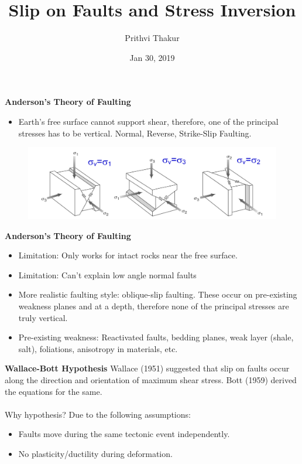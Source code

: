 \documentclass[11pt]{beamer}
\title{\textbf{Slip on Faults and Stress Inversion}}
\date{Jan 30, 2019}
\author{Prithvi Thakur}
\newcommand{\hl}[1]{\textcolor{myhl}{#1}}
\begin{document}
\maketitle

\linespread{1.3}

\begin{frame}{\textbf{Anderson's Theory of Faulting}}
    \begin{itemize}
        \item Earth's free surface cannot support shear, therefore, one of the principal stresses has to be vertical. \hl{Normal, Reverse, Strike-Slip Faulting}.
    \end{itemize}
    \begin{figure}
        \includegraphics[width=1\linewidth]{images/anderson}
    \end{figure}
\end{frame}

\begin{frame}{\textbf{Anderson's Theory of Faulting}}
    \begin{itemize}
        \item \hl{Limitation:} Only works for intact rocks near the free surface.
        \item \hl{Limitation:} Can't explain low angle normal faults
        \item More realistic faulting style: oblique-slip faulting. These occur on pre-existing weakness planes and at a depth, therefore none of the principal stresses are truly vertical.
        \item \hl{Pre-existing weakness:} Reactivated faults, bedding planes, weak layer (shale, salt), foliations, anisotropy in materials, etc.
    \end{itemize}
\end{frame}

\begin{frame}{\textbf{Wallace-Bott Hypothesis}}
    Wallace (1951) suggested that \hl{slip on faults occur along the direction and orientation of maximum shear stress}. Bott (1959) derived the equations for the same.
    \\~\\
    Why hypothesis? Due to the following assumptions:
    \begin{itemize}
        \item Faults move during the same tectonic event independently.
        \item No plasticity/ductility during deformation.
    \end{itemize}
\end{frame}
\end{document}
